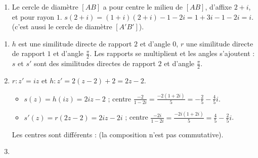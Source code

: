 \begin{corrige}
\begin{sol}
\begin{enumerate}
\begin{enumerate}
                        $\overrightarrow{AA'}$ est l'image de $\overrightarrow{\Omega A}$ par la rotation vectorielle d'angle $\frac{\pi}{2}$.
                        (Ici $z_{A'} - z_A = -1$ et $i(z_A - \omega) = i \times i = -1$.)
                        Donc $AA' = \Omega A$ et $(\Omega A) \perp (AA')$ : 
                  \item On trace la perpendiculaire à $(AA')$ en $A$ et on y reporte, au compas, la longueur $AA'$ : on obtient deux points.
                        $\Omega$ est celui pour lequel $(\overrightarrow{\Omega A},\overrightarrow{\Omega A'}) = +\frac{\pi}{4}$
                        (le triangle $\Omega A A'$ rectangle isocèle en $A$ est alors direct dans l'ordre $\Omega$, $A$, $A'$).
            \end{enumerate}
      \item Le cercle de diamètre $[AB]$ a pour centre le milieu de $[AB]$, d'affixe $2 + i$, et pour rayon $1$.
            $s(2+i) = (1+i)(2+i) - 1 - 2i = 1 + 3i - 1 - 2i = i$.
             (c'est aussi le cercle de diamètre $[A'B']$).
\end{enumerate}
\end{sol}
\begin{sol}
\begin{enumerate}
      \item $h$ est une similitude directe de rapport $2$ et d'angle $0$, $r$ une similitude directe de rapport $1$ et d'angle $\frac{\pi}{2}$.
            Les rapports se multiplient et les angles s'ajoutent : $s$ et $s'$ sont des similitudes directes de rapport $2$ et d'angle $\frac{\pi}{2}$.
      \item $r : z' = iz$ et $h : z' = 2(z - 2) + 2 = 2z - 2$.
            \begin{itemize}
                  \item $s(z) = h(iz) = 2iz - 2$ ; centre $\frac{-2}{1 - 2i} = \frac{-2(1+2i)}{5} = -\frac25 - \frac45 i$.
                  \item $s'(z) = r(2z - 2) = 2iz - 2i$ ; centre $\frac{-2i}{1-2i} = \frac{-2i(1+2i)}{5} = \frac45 - \frac25 i$.
            \end{itemize}
            Les centres sont différents :  (la composition n'est pas commutative).
      \item \begin{enumerate}

\end{enumerate}
\end{enumerate}
\end{sol}
\end{corrige}
